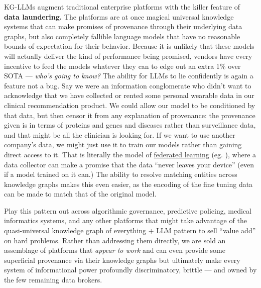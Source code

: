 KG-LLMs augment traditional enterprise platforms with the killer feature
of \textbf{data laundering.} The platforms are at once magical universal
knowledge systems that can make promises of provenance through their
underlying data graphs, but also completely fallible language models
that have no reasonable bounds of expectation for their behavior.
Because it is unlikely that these models will actually deliver the kind
of performance being promised, vendors have every incentive to feed the
models whatever they can to edge out an extra 1\% over SOTA --- \emph{who's going to know?} The
ability for LLMs to lie confidently is again a feature not a bug. Say we
were an information conglomerate who didn't want to acknowledge that we
have collected or rented some personal wearable data in our clinical
recommendation product. We could allow our model to be conditioned by that data, but
then censor it from any explanation of provenance: the provenance given
is in terms of proteins and genes and diseases rather than surveillance
data, and that might be all the clinician is looking for. If we want to
use another company's data, we might just use it to train our models
rather than gaining direct access to it. That is literally the model of
\href{https://en.wikipedia.org/wiki/Federated_learning}{federated
learning} (eg. \cite{sadilekPrivacyfirstHealthResearch2021, mcmahanTrainingUserlevelDifferentially2022} ), where a data collector
can make a promise that the data ``never leaves your device'' (even if a
model trained on it can.) The ability to resolve matching entities
across knowledge graphs makes this even easier, as the encoding of the
fine tuning data can be made to match that of the original model.

Play this pattern out across algorithmic governance, predictive
policing, medical informatics systems, and any other platforms that
might take advantage of the quasi-universal knowledge graph of
everything + LLM pattern to sell ``value add'' on hard problems. Rather
than addressing them directly, we are sold an assemblage of platforms
that \emph{appear to work} and can even provide some superficial
provenance via their knowledge graphs but ultimately make every system
of informational power profoundly discriminatory, brittle --- and owned
by the few remaining data brokers.

